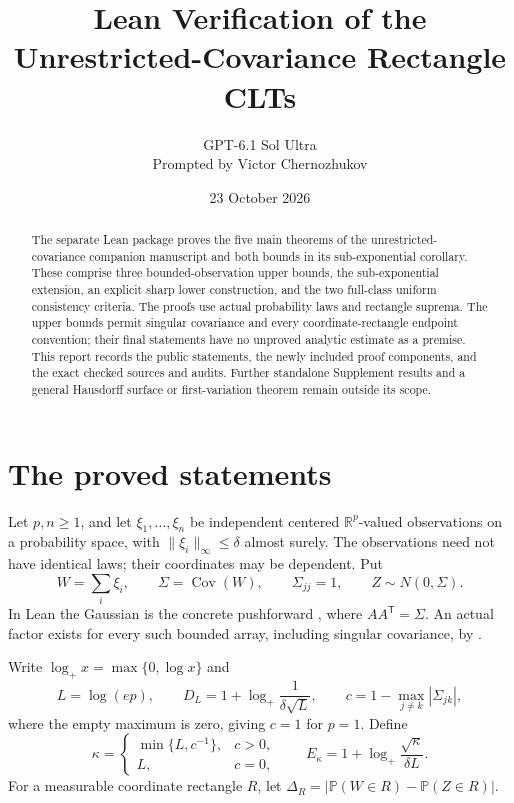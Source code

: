 \documentclass[11pt]{article}
\title{Lean Verification of the\\Unrestricted-Covariance Rectangle CLTs}
\author{GPT-6.1 Sol Ultra\\
Prompted by Victor Chernozhukov}
\date{23 October 2026}
\newcommand{\R}{\mathbb R}
\newcommand{\Prob}{\mathbb P}
\begin{document}
\maketitle

\begin{abstract}
The separate Lean package  proves the
five main theorems of the unrestricted-covariance companion manuscript
and both bounds in its sub-exponential corollary. These comprise three
bounded-observation upper bounds, the sub-exponential extension, an
explicit sharp lower construction, and the two full-class uniform
consistency criteria. The proofs use actual probability laws and
rectangle suprema. The upper bounds permit singular covariance and
every coordinate-rectangle endpoint convention; their final statements
have no unproved analytic estimate as a premise. This report records the
public statements, the newly included proof components, and the exact
checked sources and audits. Further standalone Supplement results and a
general Hausdorff surface or first-variation theorem remain outside its
scope.
\end{abstract}

\section{The proved statements}
Let $p,n\ge1$, and let $\xi_1,\ldots,\xi_n$ be independent centered
$\R^p$-valued observations on a probability space, with
$\|\xi_i\|_\infty\le\delta$ almost surely. The observations need not
have identical laws; their coordinates may be dependent. Put
\[
 W=\sum_i\xi_i,\qquad \Sigma=\operatorname{Cov}(W),\qquad
 \Sigma_{jj}=1,\qquad Z\sim N(0,\Sigma).
\]
In Lean the Gaussian is the concrete pushforward ,
where $AA^{\mathsf T}=\Sigma$. An actual factor exists for every such
bounded array, including singular covariance, by
.

Write $\log_+x=\max\{0,\log x\}$ and
\[
 L=\log(ep),\qquad D_L=1+\log_+\frac1{\delta\sqrt L},\qquad
 c=1-\max_{j\ne k}|\Sigma_{jk}|,
\]
where the empty maximum is zero, giving $c=1$ for $p=1$. Define
\[
 \kappa=\begin{cases}\min\{L,c^{-1}\},&c>0,\\L,&c=0,\end{cases}
 \qquad E_\kappa=1+\log_+\frac{\sqrt\kappa}{\delta L}.
\]
For a measurable coordinate rectangle $R$, let
$\Delta_R=|\Prob(W\in R)-\Prob(Z\in R)|$.
\end{document}
